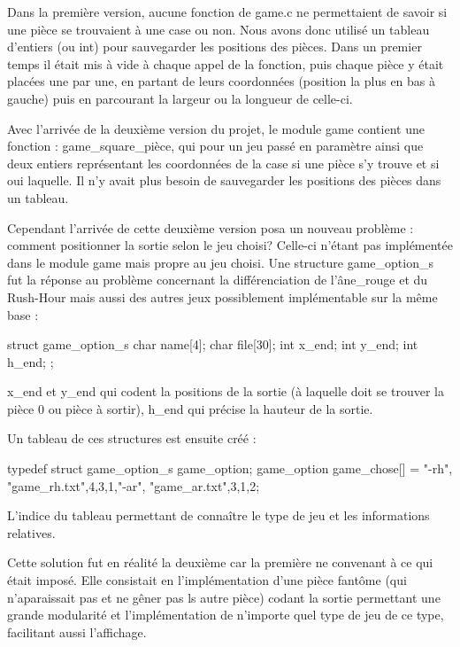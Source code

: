 \documentclass{report}
\begin{document}
Dans la première version, aucune fonction de game.c ne permettaient de savoir si une pièce se trouvaient à une case ou non. Nous avons donc utilisé un tableau d'entiers (ou int) pour sauvegarder les positions des pièces. Dans un premier temps il était mis à vide à chaque appel de la fonction, puis chaque pièce y était placées une par une, en partant de leurs coordonnées (position la plus en bas à gauche) puis en parcourant la largeur ou la longueur de celle-ci.

Avec l'arrivée de la deuxième version du projet, le module game contient une fonction : game\_square\_pièce, qui pour un jeu passé en paramètre ainsi que deux entiers représentant les coordonnées de la case si une pièce s'y trouve et si oui laquelle. Il n'y avait plus besoin de sauvegarder les positions des pièces dans un tableau.

Cependant l'arrivée de cette deuxième version posa un nouveau problème : comment positionner la sortie selon le jeu choisi? Celle-ci n'étant pas implémentée dans le module game mais propre au jeu choisi. Une structure game\_option\_s fut la réponse au problème concernant la différenciation de l'âne\_rouge et du Rush-Hour mais aussi des autres jeux possiblement implémentable sur la même base :

\begin{verbatimtab}[10]
struct game_option_s{
    char name[4];
    char file[30];
    int x_end;
    int y_end;
    int h_end;
};
\end{verbatimtab}

\noindent
x\_end et y\_end qui codent la positions de la sortie (à laquelle doit se trouver la pièce 0 ou pièce à sortir), h\_end qui précise la hauteur de la sortie.

\noindent
Un tableau de ces structures est ensuite créé :

\begin{verbatimtab}[10]
typedef struct game_option_s game_option;
game_option game_chose[] = {{"-rh", "game_rh.txt",4,3,1},{"-ar", "game_ar.txt",3,1,2}};
\end{verbatimtab}

\noindent
L'indice du tableau permettant de connaître le type de jeu et les informations relatives.

Cette solution fut en réalité la deuxième car la première ne convenant à ce qui était imposé. Elle consistait en l'implémentation d'une pièce fantôme (qui n'aparaissait pas et ne gêner pas ls autre pièce) codant la sortie permettant une grande modularité et l'implémentation de n'importe quel type de jeu de ce type, facilitant aussi l'affichage.
\end{document}

